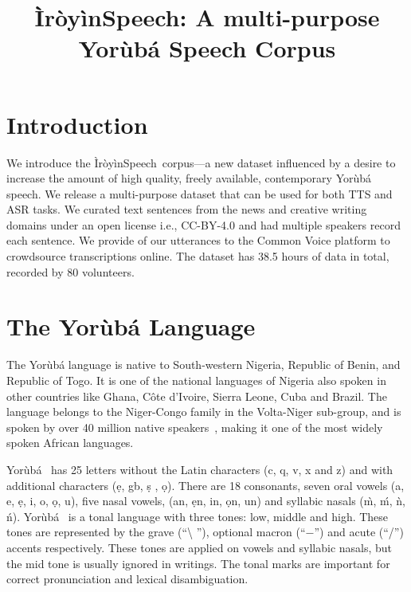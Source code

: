\documentclass{article}
\title{\`{I}r\`{o}y\`{i}nSpeech: A multi-purpose Yor\`{u}b\'{a} Speech Corpus}
\newcommand{\Yoruba}{Yor\`{u}b\'{a} }
\newcommand{\yoruba}{Yor\`{u}b\'{a} \ }
\newcommand{\iroyin}{\`{I}r\`{o}y\`{i}nSpeech}
\begin{document}
%
\maketitle
 
\section{Introduction}
\label{sec:intro}



We introduce the \iroyin \ corpus---a new dataset influenced by a desire to increase the amount of high quality, freely available, contemporary \Yoruba{} speech. We release a multi-purpose dataset that can be used for both TTS and ASR tasks. We curated text sentences from the news and creative writing domains under an open license i.e., CC-BY-4.0 and had multiple speakers record each sentence.  We provide  of our utterances to the Common Voice \cite{commonvoice} platform to crowdsource transcriptions online. The dataset has 38.5 hours of data in total, recorded by 80 volunteers.


\section{The Yor\`{u}b\'{a} Language}
 The \Yoruba  language is native to South-western Nigeria, Republic of Benin, and Republic of Togo. It is one of the national languages of Nigeria also spoken in other countries like Ghana, Côte d'Ivoire, Sierra Leone, Cuba and Brazil. The language belongs to the Niger-Congo family in the Volta-Niger sub-group, and is spoken by over 40 million native speakers~\cite{Ethnologue2019}, making it one of the most widely spoken African languages. 
 
 \yoruba has 25 letters without the Latin characters  (c, q, v, x and z) and with additional characters ({\d e}, gb, {\d s} , {\d o}). 
 There are 18 consonants, 
 seven oral vowels  (a, e, {\d e}, i, o, {\d o}, u), five nasal vowels, 
 (an, {\d e}n, in, 
 {\d o}n, un) and syllabic nasals 
({\`{m}}, {\'{m}}, {\`{n}}, {\'{n}}). \yoruba is a tonal language with three tones: low, middle and high. These tones are represented by the grave (``\textbackslash
''), optional macron (``$-$'') and acute (``/'') accents respectively.  These tones are applied on vowels and syllabic nasals, but the mid tone is usually ignored in writings. The tonal marks are important for correct pronunciation and lexical disambiguation. 
\end{document}

